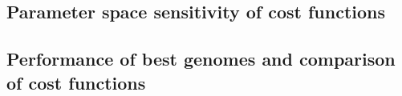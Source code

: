 \subsection{Parameter space sensitivity of cost functions}


\subsection{Performance of best genomes and comparison of cost functions }
